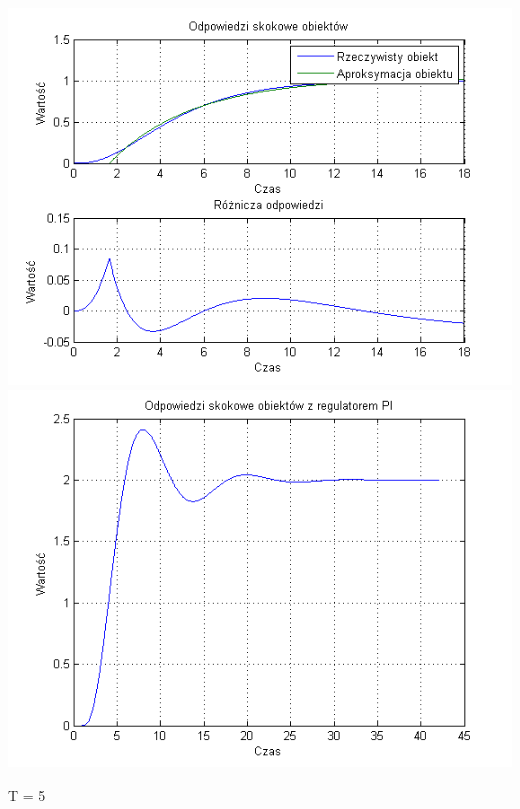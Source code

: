 \documentclass[10pt,a4paper]{article}
\begin{document}
\begin{center}
\includegraphics[scale=1]{images/jeden/skrypt_99.png}\\
\includegraphics[scale=1]{images/jeden/skrypt_100.png}\\
\end{center}
\newpage
T = 5
\end{document}
